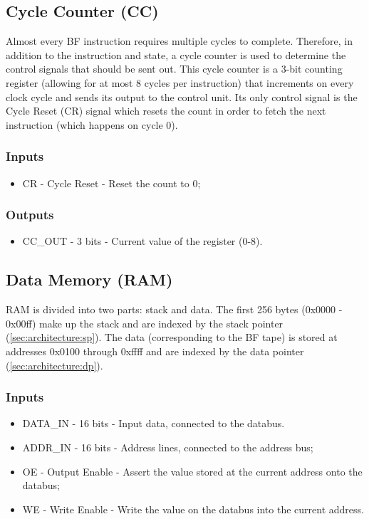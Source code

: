 \subsection{Cycle Counter (CC)} \label{sec:architecture:cc}
Almost every BF instruction requires multiple cycles to complete. Therefore, in addition to the instruction and state, a cycle counter is used to determine the control signals that should be sent out.  This cycle counter is a 3-bit counting register (allowing for at most 8 cycles per instruction) that increments on every clock cycle and sends its output to the control unit. Its only control signal is the Cycle Reset (CR) signal which resets the count in order to fetch the next instruction (which happens on cycle 0).

\subsubsection*{Inputs}
\begin{itemize}
\itemsep0em
\item CR - Cycle Reset - Reset the count to 0;
\end{itemize}

\subsubsection*{Outputs}
\begin{itemize}
\itemsep0em
\item CC\_OUT - 3 bits - Current value of the register (0-8).
\end{itemize}

\subsection{Data Memory (RAM)}  \label{sec:architecture:ram}
RAM is divided into two parts: stack and data. The first 256 bytes (0x0000 - 0x00ff) make up the stack and are indexed by the stack pointer (\ref{sec:architecture:sp}). The data (corresponding to the BF tape) is stored at addresses 0x0100 through 0xffff and are indexed by the data pointer (\ref{sec:architecture:dp}). 

\subsubsection*{Inputs}
\begin{itemize}
\itemsep0em 
\item DATA\_IN - 16 bits - Input data, connected to the databus.
\item ADDR\_IN - 16 bits - Address lines, connected to the address bus;
\item OE - Output Enable - Assert the value stored at the current address onto the databus;
\item WE - Write Enable - Write the value on the databus into the current address.
\end{itemize}

